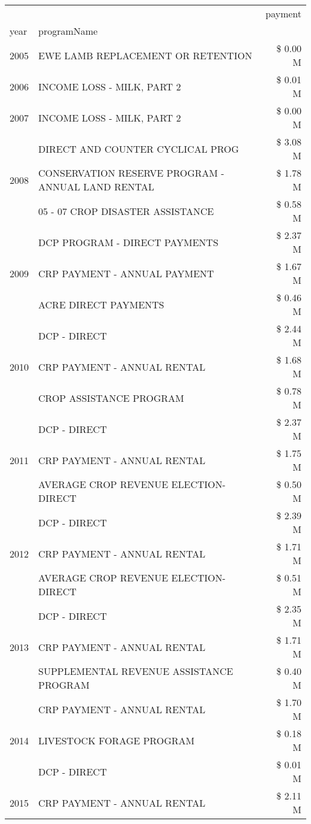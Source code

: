 \begin{tabular}{llr}
\toprule
 &  & payment \\
year & programName &  \\
\midrule
2005 & EWE LAMB REPLACEMENT OR RETENTION & \$ 0.00 M \\
\cline{1-3}
2006 & INCOME LOSS - MILK, PART 2 & \$ 0.01 M \\
\cline{1-3}
2007 & INCOME LOSS - MILK, PART 2 & \$ 0.00 M \\
\cline{1-3}
\multirow[t]{3}{*}{2008} & DIRECT AND COUNTER CYCLICAL PROG & \$ 3.08 M \\
 & CONSERVATION RESERVE PROGRAM - ANNUAL LAND RENTAL & \$ 1.78 M \\
 & 05 - 07 CROP DISASTER ASSISTANCE & \$ 0.58 M \\
\cline{1-3}
\multirow[t]{3}{*}{2009} & DCP PROGRAM - DIRECT PAYMENTS & \$ 2.37 M \\
 & CRP PAYMENT - ANNUAL PAYMENT & \$ 1.67 M \\
 & ACRE DIRECT PAYMENTS & \$ 0.46 M \\
\cline{1-3}
\multirow[t]{3}{*}{2010} & DCP - DIRECT & \$ 2.44 M \\
 & CRP PAYMENT - ANNUAL RENTAL & \$ 1.68 M \\
 & CROP ASSISTANCE PROGRAM & \$ 0.78 M \\
\cline{1-3}
\multirow[t]{3}{*}{2011} & DCP - DIRECT & \$ 2.37 M \\
 & CRP PAYMENT - ANNUAL RENTAL & \$ 1.75 M \\
 & AVERAGE CROP REVENUE ELECTION-DIRECT & \$ 0.50 M \\
\cline{1-3}
\multirow[t]{3}{*}{2012} & DCP - DIRECT & \$ 2.39 M \\
 & CRP PAYMENT - ANNUAL RENTAL & \$ 1.71 M \\
 & AVERAGE CROP REVENUE ELECTION-DIRECT & \$ 0.51 M \\
\cline{1-3}
\multirow[t]{3}{*}{2013} & DCP - DIRECT & \$ 2.35 M \\
 & CRP PAYMENT - ANNUAL RENTAL & \$ 1.71 M \\
 & SUPPLEMENTAL REVENUE ASSISTANCE PROGRAM & \$ 0.40 M \\
\cline{1-3}
\multirow[t]{3}{*}{2014} & CRP PAYMENT - ANNUAL RENTAL & \$ 1.70 M \\
 & LIVESTOCK FORAGE PROGRAM & \$ 0.18 M \\
 & DCP - DIRECT & \$ 0.01 M \\
\cline{1-3}
\multirow[t]{3}{*}{2015} & CRP PAYMENT - ANNUAL RENTAL & \$ 2.11 M \\

\end{tabular}
